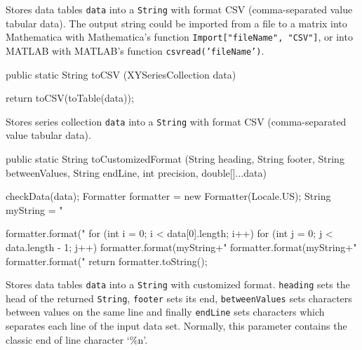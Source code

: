 \begin{tabb}
   Stores data tables \texttt{data} into a \texttt{String}
   with format CSV (comma-separated value tabular data).
   The output string could be imported from a file to a matrix
   into Mathematica with Mathematica's function \texttt{Import["fileName", "CSV"]},
   or into MATLAB with MATLAB's function \texttt{csvread('fileName')}.
\end{tabb}
\begin{htmlonly}
\end{htmlonly}
\begin{code}

   public static String toCSV (XYSeriesCollection data) \begin{hide} {
      return toCSV(toTable(data));
   }\end{hide}
\end{code}
\begin{tabb}
   Stores series collection \texttt{data} into a \texttt{String}
   with format CSV (comma-separated value tabular data).
\end{tabb}
\begin{htmlonly}
\end{htmlonly}
\begin{code}

   public static String toCustomizedFormat (String heading, String footer,
                                   String betweenValues, String endLine,
                                   int precision, double[]...data) \begin{hide} {
      checkData(data);
      Formatter formatter = new Formatter(Locale.US);
      String myString = "%

      formatter.format("%
      for (int i = 0; i < data[0].length; i++) {
         for (int j = 0; j < data.length - 1; j++) {
            formatter.format(myString+"%
         }
         formatter.format(myString+"%
      }
      formatter.format("%
      return formatter.toString();
   }\end{hide}
\end{code}
\begin{tabb}
Stores data tables \texttt{data} into a \texttt{String} with customized format.
\texttt{heading} sets the head of the returned \texttt{String}, \texttt{footer}
sets its end, \texttt{betweenValues} sets characters between values on the same
 line and finally \texttt{endLine} sets characters which separates each line of
 the input data set. Normally, this parameter contains the classic end of line
  character `\%n'.
\end{tabb}
